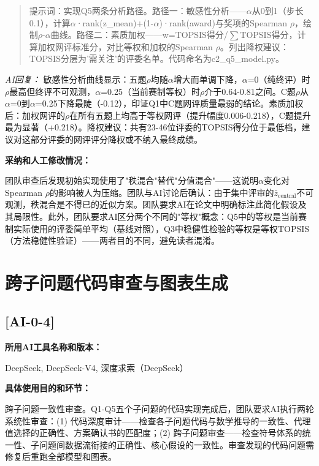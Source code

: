 \documentclass[12pt,a4paper]{ctexart}
\begin{document}
\begin{quote}
提示词：实现Q5两条分析路径。路径一：敏感性分析——$\alpha$从0到1（步长0.1），计算$\alpha$·rank(z\_mean)+(1-$\alpha$)·rank(award)与奖项的Spearman $\rho$，绘制$\rho$-$\alpha$曲线。路径二：素质加权——w=TOPSIS得分/$\sum$TOPSIS得分，计算加权网评标准分，对比等权和加权的Spearman $\rho$。列出降权建议：TOPSIS分层为'需关注'的评委名单。代码命名为c2\_q5\_model.py。
\end{quote}

\textit{AI回复：} 敏感性分析曲线显示：五题$\rho$均随$\alpha$增大而单调下降，$\alpha$=0（纯终评）时$\rho$最高但终评不可观测，$\alpha$=0.25（当前赛制等权）时$\rho$介于0.64-0.81之间。C题$\rho$从$\alpha$=0到$\alpha$=0.25下降最陡（-0.12），印证Q1中C题网评质量最弱的结论。素质加权后：加权网评的$\rho$在所有五题上均高于等权网评（提升幅度0.006-0.218），C题提升最为显著（+0.218）。降权建议：共有23-46位评委的TOPSIS得分位于最低档，建议对这部分评委的网评评分降权或不纳入最终成绩。

\textbf{采纳和人工修改情况：}\par
团队审查后发现初始实现使用了"秩混合"替代"分值混合"——这说明$\alpha$变化对Spearman $\rho$的影响被人为压缩。团队与AI讨论后确认：由于集中评审的$\bar{z}_{\text{central}}$不可观测，秩混合是不得已的近似方案。团队要求AI在论文中明确标注此简化假设及其局限性。此外，团队要求AI区分两个不同的"等权"概念：Q5中的等权是当前赛制实际使用的评委简单平均（基线对照），Q3中稳健性检验的等权是等权TOPSIS（方法稳健性验证）——两者目的不同，避免读者混淆。

\section*{跨子问题代码审查与图表生成}

\subsection*{[AI-0-4]}

\textbf{所用AI工具名称和版本：}\par
DeepSeek, DeepSeek-V4, 深度求索（DeepSeek）

\textbf{具体使用目的和环节：}\par
跨子问题一致性审查。Q1-Q5五个子问题的代码实现完成后，团队要求AI执行两轮系统性审查：(1) 代码深度审计——检查各子问题代码与数学推导的一致性、代理值选择的正确性、方案确认书的匹配度；(2) 跨子问题审查——检查符号体系的统一性、子问题间数据流衔接的正确性、核心假设的一致性。审查发现的代码问题需修复后重跑全部模型和图表。
\end{document}
